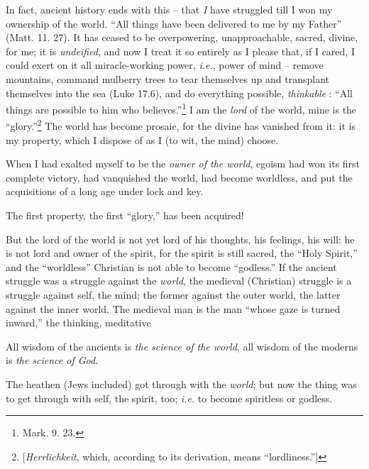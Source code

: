 \documentclass[12pt,a4paper]{book}
\begin{document}
In fact, ancient history ends with this -- that \textit{I} have struggled till 
I won my ownership of the world. ``All things have been delivered to me by my 
Father'' (Matt. 11. 27). It has ceased to be overpowering, unapproachable, 
sacred, divine, for me; it is \textit{undeified}, and now I treat it so 
entirely as I please that, if I cared, I could exert on it all miracle-working 
power, \textit{i.e.}, power of mind -- remove mountains, command mulberry 
trees to tear themselves up and transplant themselves into the sea (Luke 
17.6), and do everything possible, \textit{thinkable} : ``All things are 
possible to him who believes.''\footnote{Mark. 9. 23.} I am the \textit{lord} 
of the world, mine is the ``glory.''\footnote{[\textit{Herrlichkeit}, which, 
according to its derivation, means ``lordliness.'']} The world has become 
prosaic, for the divine has vanished from it: it is my property, which I 
dispose of as I (to wit, the mind) choose.

When I had exalted myself to be the \textit{owner of the world}, egoism had 
won its first complete victory, had vanquished the world, had become 
worldless, and put the acquisitions of a long age under lock and key.

The first property, the first ``glory,'' has been acquired!

But the lord of the world is not yet lord of his thoughts, his feelings, his 
will: he is not lord and owner of the spirit, for the spirit is still sacred, 
the ``Holy Spirit,'' and the ``worldless'' Christian is not able to become 
``godless.'' If the ancient struggle was a struggle against the 
\textit{world}, the medieval (Christian) struggle is a struggle against self, 
the mind; the former against the outer world, the latter against the inner 
world. The medieval man is the man ``whose gaze is turned inward,'' the 
thinking, meditative

All wisdom of the ancients is \textit{the science of the world}, all wisdom of 
the moderns is \textit{the science of God}.

The heathen (Jews included) got through with the \textit{world}; but now the 
thing was to get through with self, the spirit, too; \textit{i.e.} to become 
spiritless or godless.
\end{document}
